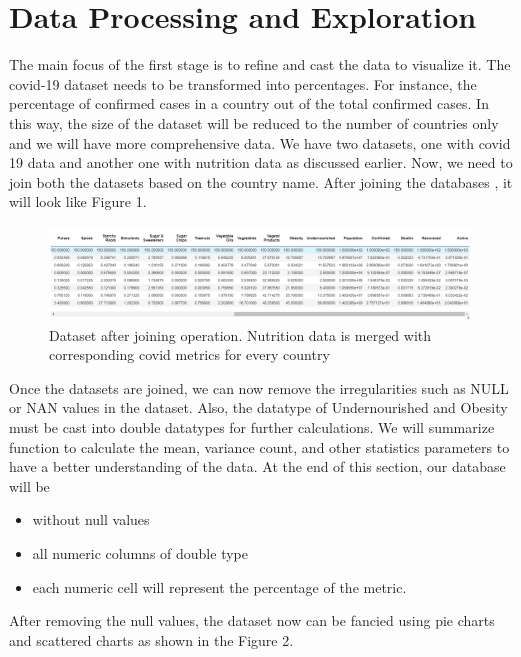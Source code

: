 \documentclass[journal,twoside,web]{ieeecolor}
\begin{document}
\section{Data Processing and Exploration}
The main focus of the first stage is to refine and cast the data to visualize it. The covid-19 dataset needs to be transformed into percentages. For instance, the percentage of confirmed cases in a country out of the total confirmed cases. In this way, the size of the dataset will be reduced to the number of countries only and we will have more comprehensive data. We have two datasets, one with covid 19 data and another one with nutrition data as discussed earlier. Now, we need to join both the datasets based on the country name. After joining the databases \cite{drabas2017learning}, it will look like Figure 1.
\begin{figure}[!t]
\centerline{\includegraphics[width=\columnwidth]{profig0.png}}
\caption{Dataset after joining operation.
Nutrition data is merged with corresponding covid metrics for every country}
\label{fig1}
\end{figure}
Once the datasets are joined, we can now remove the irregularities such as NULL or NAN values in the dataset. Also, the datatype of Undernourished and Obesity must be cast into double datatypes for further calculations. We will summarize function to calculate the mean, variance count, and other statistics parameters to have a better understanding of the data. At the end of this section, our database will be
\begin{itemize}
    \item without null values
    \item all numeric columns of double type 
    \item each numeric cell will represent the percentage of the metric.
\end{itemize}
After removing the null values, the dataset now can be fancied using pie charts and scattered charts \cite{keim2013big} as shown in the Figure 2.
\end{document}
